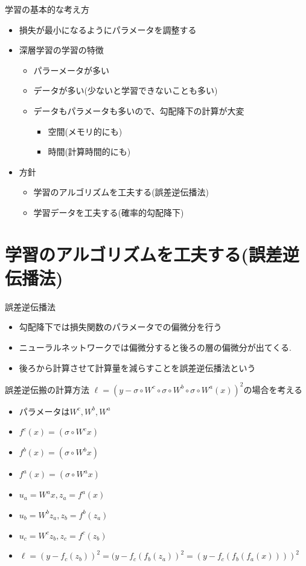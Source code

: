 \begin{frame}[fragile]{学習の基本的な考え方}
\begin{itemize}
\item 損失が最小になるようにパラメータを調整する
\item 深層学習の学習の特徴
  \begin{itemize}
  \item パラーメータが多い
  \item データが多い(少ないと学習できないことも多い)
  \item データもパラメータも多いので、勾配降下の計算が大変
    \begin{itemize}
    \item 空間(メモリ的にも)
    \item 時間(計算時間的にも)
    \end{itemize}
  \end{itemize}
\item 方針
  \begin{itemize}
  \item 学習のアルゴリズムを工夫する(誤差逆伝播法)
  \item 学習データを工夫する(確率的勾配降下)
  \end{itemize}
\end{itemize}
\end{frame}

\section{学習のアルゴリズムを工夫する(誤差逆伝播法)}

\begin{frame}[fragile]{誤差逆伝播法}
\begin{itemize}
\item 勾配降下では損失関数のパラメータでの偏微分を行う
\item ニューラルネットワークでは偏微分すると後ろの層の偏微分が出てくる.
\item 後ろから計算させて計算量を減らすことを誤差逆伝播法という
\end{itemize}
\end{frame}


\begin{frame}[fragile]{誤差逆伝搬の計算方法}
$\ell = (y - \sigma \circ W^c \circ \sigma \circ W^{b} \circ \sigma \circ W^{a}(x))^2$の場合を考える
\begin{itemize}
  \item パラメータは$W^c, W^b, W^a$
  \item $f^c(x) = (\sigma \circ W^cx)$
  \item $f^b(x) = (\sigma \circ W^bx)$
  \item $f^a(x) = (\sigma \circ W^ax)$
  \item $u_a = W^ax, z_a = f^a(x)$
  \item $u_b = W^bz_a, z_b = f^b(z_a)$
  \item $u_c = W^cz_b, z_c = f^c(z_b)$
  \item $\ell = (y - f_c(z_b))^2 = (y - f_c(f_b(z_a))^2 = (y - f_c(f_b(f_a(x))))^2$
\end{itemize}
\end{frame}



